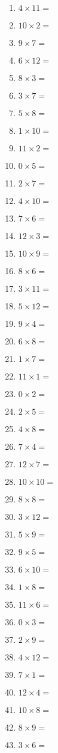 \documentclass{article}
\begin{document}
\begin{multicols}{4}
\begin{enumerate}[label=\arabic*.,itemsep=0pt,parsep=0pt]
\item $4 \times 11 =$
\item $10 \times 2 =$
\item $9 \times 7 =$
\item $6 \times 12 =$
\item $8 \times 3 =$
\item $3 \times 7 =$
\item $5 \times 8 =$
\item $1 \times 10 =$
\item $11 \times 2 =$
\item $0 \times 5 =$
\item $2 \times 7 =$
\item $4 \times 10 =$
\item $7 \times 6 =$
\item $12 \times 3 =$
\item $10 \times 9 =$
\item $8 \times 6 =$
\item $3 \times 11 =$
\item $5 \times 12 =$
\item $9 \times 4 =$
\item $6 \times 8 =$
\item $1 \times 7 =$
\item $11 \times 1 =$
\item $0 \times 2 =$
\item $2 \times 5 =$
\item $4 \times 8 =$
\item $7 \times 4 =$
\item $12 \times 7 =$
\item $10 \times 10 =$
\item $8 \times 8 =$
\item $3 \times 12 =$
\item $5 \times 9 =$
\item $9 \times 5 =$
\item $6 \times 10 =$
\item $1 \times 8 =$
\item $11 \times 6 =$
\item $0 \times 3 =$
\item $2 \times 9 =$
\item $4 \times 12 =$
\item $7 \times 1 =$
\item $12 \times 4 =$
\item $10 \times 8 =$
\item $8 \times 9 =$
\item $3 \times 6 =$

\end{enumerate}
\end{multicols}
\end{document}
